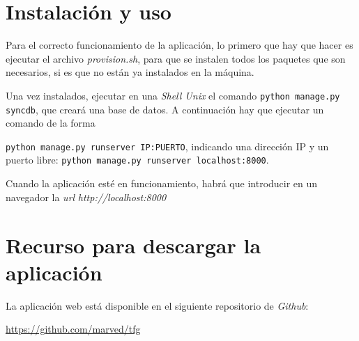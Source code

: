 \documentclass[a4paper, 12pt]{book}
\begin{document}

\cleardoublepage





\cleardoublepage
\appendix
\chapter{Instalación y uso}
\label{app:instalacion-y-uso}

Para el correcto funcionamiento de la aplicación, lo primero que hay que hacer es ejecutar el archivo \textit{provision.sh}, para que se instalen todos los paquetes que son necesarios, si es que no están ya instalados en la máquina.

Una vez instalados, ejecutar en una \textit{Shell Unix} el comando \verb|python manage.py syncdb|, que creará una base de datos. A continuación hay que ejecutar un comando de la forma 

\verb|python manage.py runserver IP:PUERTO|, indicando una dirección IP y un puerto libre: \verb|python manage.py runserver localhost:8000|.

Cuando la aplicación esté en funcionamiento, habrá que introducir en un navegador la \textit{url} \textit{http://localhost:8000}


\chapter{Recurso para descargar la aplicación}
\label{app:descargar-aplicacion}

La aplicación web está disponible en el siguiente repositorio de \textit{Github}: 

\url{https://github.com/marved/tfg}
\end{document}
